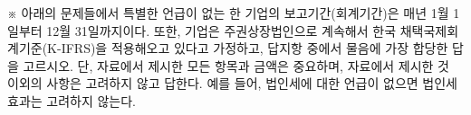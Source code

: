 \begin{framedtext}
※ 아래의 문제들에서 특별한 언급이 없는 한 기업의 보고기간(회계기간)은 매년 1월 1일부터 12월 31일까지이다. 또한, 기업은 주권상장법인으로 계속해서 한국 채택국제회계기준(K-IFRS)을 적용해오고 있다고 가정하고, 답지항 중에서 물음에 가장 합당한 답을 고르시오. 단, 자료에서 제시한 모든 항목과 금액은 중요하며, 자료에서 제시한 것 이외의 사항은 고려하지 않고 답한다. 예를 들어, 법인세에 대한 언급이 없으면 법인세 효과는 고려하지 않는다. \par
\end{framedtext}
